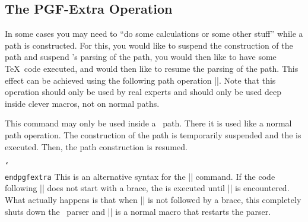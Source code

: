 \subsection{The PGF-Extra Operation}

In some cases you may need to ``do some calculations or some other
stuff'' while a path is constructed. For this, you would like to
suspend the construction of the path and suspend \tikzname's parsing
of the path, you would then like to have some \TeX\ code executed, and
would then like to resume the parsing of the path. This effect can be
achieved using the following path operation |\pgfextra|. Note that
this operation should only be used by real experts and should only be
used deep inside clever macros, not on normal paths.

\begin{command}{\pgfextra{}}
  This command may only be used inside a \tikzname\ path. There it is
  used like a normal path operation. The construction of the path is
  temporarily suspended and the  is executed. Then, the
  path construction is resumed.

\begin{codeexample}[]
\newdimen\mydim
\begin{tikzpicture}
  \mydim=1cm
  \draw (0pt,\mydim) \pgfextra{\mydim=2cm} -- (0pt,\mydim);
\end{tikzpicture}
\end{codeexample}
\end{command}

\begin{command}{\pgfextra {} \texttt{\char`\\endpgfextra}}
  This is an alternative syntax for the |\pgfextra| command. If the
  code following |\pgfextra| does not start with a brace, the
   is executed until |\endpgfextra| is encountered. What
  actually happens is that when |\pgfextra| is not followed by a
  brace, this completely shuts down the \tikzname\ parser and
  |\endpgfextra| is a normal macro that restarts the parser.

\begin{codeexample}[]
\newdimen\mydim
\begin{tikzpicture}
  \mydim=1cm
  \draw (0pt,\mydim)
    \pgfextra \mydim=2cm \endpgfextra -- (0pt,\mydim);
\end{tikzpicture}
\end{codeexample}
\end{command}
